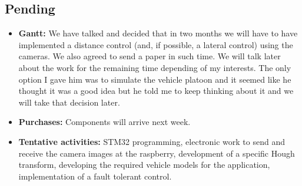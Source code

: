 \subsection{Pending}

\begin{itemize}
\item \textbf{Gantt:} We have talked and decided that in two months we will have to have implemented a distance control (and, if possible, a lateral control) using the cameras. We also agreed to send a paper in such time. We will talk later about the work for the remaining time depending of my interests. The only option I gave him was to simulate the vehicle platoon and it seemed like he thought it was a good idea but he told me to keep thinking about it and we will take that decision later.
\item \textbf{Purchases:} Components will arrive next week.
\item \textbf{Tentative activities:} STM32 programming, electronic work to send and receive the camera images at the raspberry, development of a specific Hough transform, developing the required vehicle models for the application, implementation of a fault tolerant control.
\end{itemize}
